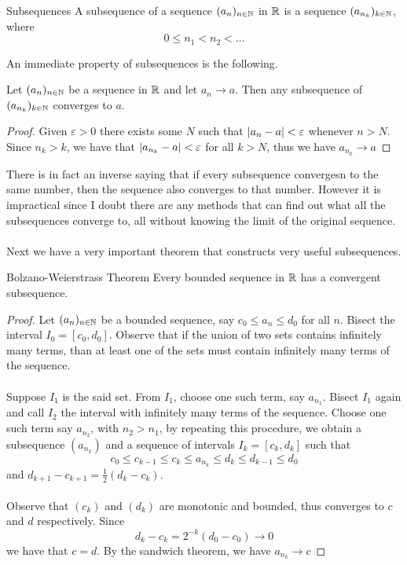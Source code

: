 \documentclass[a4paper]{article}
\begin{document}
\begin{defn}{Subsequences}{} A subsequence of a sequence $(a_n)_{n\in\mathbb{N}}$ in $\mathbb{R}$ is a sequence $(a_{n_k})_{k\in\mathbb{N}}$, where $$0\leq n_1<n_2<\dots$$
\end{defn}

An immediate property of subsequences is the following. 

\begin{prp}{}{} Let $(a_n)_{n\in\mathbb{N}}$ be a sequence in $\mathbb{R}$ and let $a_n\to a$. Then any subsequence of $(a_{n_k})_{k\in\mathbb{N}}$ converges to $a$. \tcbline
\begin{proof} Given $\varepsilon>0$ there exists some $N$ such that $\abs{a_n-a}<\varepsilon$ whenever $n>N$. Since $n_k>k$, we have that $\abs{a_{n_k}-a}<\varepsilon$ for all $k>N$, thus we have $a_{n_k}\to a$
\end{proof}
\end{prp}

There is in fact an inverse saying that if every subsequence convergesn to the same number, then the sequence also converges to that number. However it is impractical since I doubt there are any methods that can find out what all the subsequences converge to, all without knowing the limit of the original sequence. \\~\\

Next we have a very important theorem that constructs very useful subsequences. 

\begin{thm}{Bolzano-Weierstrass Theorem}{} Every bounded sequence in $\mathbb{R}$ has a convergent subsequence. \tcbline
\begin{proof} Let $(a_n)_{n\in\mathbb{N}}$ be a bounded sequence, say $c_0\leq a_n\leq d_0$ for all $n$. Bisect the interval $I_0=[c_0,d_0]$. Observe that if the union of two sets contains infinitely many terms, than at least one of the sets must contain infinitely many terms of the sequence. \\~\\
Suppose $I_1$ is the said set. From $I_1$, choose one such term, say $a_{n_1}$. Bisect $I_1$ again and call $I_2$ the interval with infinitely many terms of the sequence. Choose one such term say $a_{n_2}$, with $n_2>n_1$, by repeating this procedure, we obtain a subsequence $(a_{n_k})$ and a sequence of intervals $I_k=[c_k,d_k]$ such that $$c_0\leq c_{k-1}\leq c_k\leq a_{n_k}\leq d_k\leq d_{k-1}\leq d_0$$ and $d_{k+1}-c_{k+1}=\frac{1}{2}(d_k-c_k)$. \\~\\
Observe that $(c_k)$ and $(d_k)$ are monotonic and bounded, thus converges to $c$ and $d$ respectively. Since $$d_k-c_k=2^{-k}(d_0-c_0)\to 0$$ we have that $c=d$. By the sandwich theorem, we have $a_{n_k}\to c$
\end{proof}
\end{thm}
\end{document}
